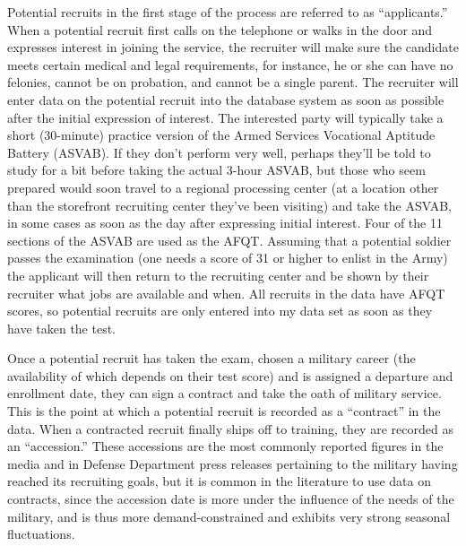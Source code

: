 \documentclass[12pt] {article}
\begin{document}
Potential recruits in the first stage of the process are referred
to as {}``applicants.'' When a potential recruit first calls on
the telephone or walks in the door and expresses interest in joining
the service, the recruiter will make sure the candidate meets certain
medical and legal requirements, for instance, he or she can have no
felonies, cannot be on probation, and cannot be a single parent. The
recruiter will enter data on the potential recruit into the database
system as soon as possible after the initial expression of interest.
The interested party will typically take a short (30-minute) practice
version of the Armed Services Vocational Aptitude Battery (ASVAB).
If they don't perform very well, perhaps they'll be told to study
for a bit before taking the actual 3-hour ASVAB, but those who seem
prepared would soon travel to a regional processing center (at a location
other than the storefront recruiting center they've been visiting)
and take the ASVAB, in some cases as soon as the day after expressing
initial interest. Four of the 11 sections of the ASVAB are used as
the AFQT. Assuming that a potential soldier passes the examination
(one needs a score of 31 or higher to enlist in the Army) the applicant will
then return to the recruiting center and be shown by their recruiter
what jobs are available and when. All recruits in the data have AFQT scores, so potential recruits are only entered into
my data set as soon as they have taken the test.

Once a potential recruit has taken the exam, chosen a military career
(the availability of which depends on their test score) and is assigned
a departure and enrollment date, they can sign a contract and take
the oath of military service. This is the point at which a potential
recruit is recorded as a {}``contract'' in the data. When a contracted
recruit finally ships off to training, they are recorded as an {}``accession.''
These accessions are the most commonly reported figures in the media
and in Defense Department press releases pertaining to the military
having reached its recruiting goals, but it is common in the literature
to use data on contracts, since the accession date is more under the
influence of the needs of the military, and is thus more demand-constrained
and exhibits very strong seasonal fluctuations.
\end{document}
